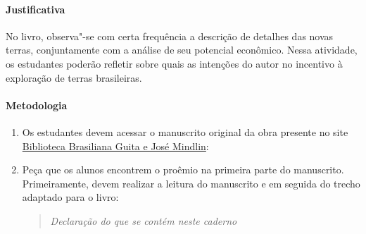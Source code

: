 \documentclass[12pt]{extarticle}
\begin{document}
\paragraph{Justificativa} No livro, observa"-se com certa frequência a descrição de detalhes das
novas terras, conjuntamente com a análise de seu potencial econômico. Nessa atividade, os estudantes poderão refletir sobre quais as intenções do autor no incentivo à exploração de terras brasileiras.

\paragraph{Metodologia}

\begin{enumerate}

\item Os estudantes devem acessar o manuscrito original da obra presente no site 
\href{https://digital.bbm.usp.br/view/?45000009023#page/1/mode/2up}%
{Biblioteca Brasiliana Guita e José Mindlin}:

\item Peça que os alunos encontrem o proêmio na primeira parte do manuscrito. Primeiramente, devem realizar a leitura do manuscrito e em seguida do trecho adaptado para o livro:

\begin{quote}\emph{Declaração do que se contém neste caderno}


\end{quote}
\end{enumerate}
\end{document}
